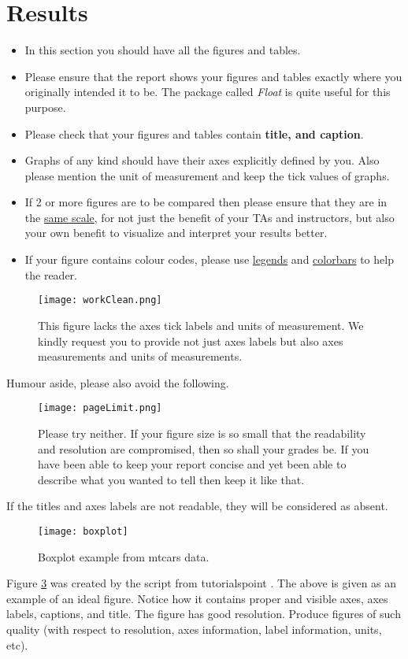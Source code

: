 \section{Results}
\begin{itemize}
 \item In this section you should have all the figures and tables.
 \item Please ensure that the report shows your figures and tables exactly where you originally intended it to be. 
 The package called \textit{Float} is quite useful for this purpose. 
 \item Please check that your figures and tables contain \textbf{title, and caption}.
 \item Graphs of any kind should have their axes explicitly defined by you.  Also please mention the unit of measurement and keep the tick values of graphs.
 \item If 2 or more figures are to be compared then please ensure that they are in the \underline{same scale}, for not just the benefit of your TAs and instructors, but
 also your own benefit to visualize and interpret your results better.
 \item If your figure contains colour codes, please use \underline{legends} and \underline{colorbars} to help the reader.
\end{itemize}
\begin{figure}[H]
\centering
   \texttt{[image: workClean.png]}
   \caption{This figure lacks the axes tick labels and units of measurement. We kindly request you to provide not just axes labels but also axes measurements and units of measurements.}
   \label{fig:noTicks}
\end{figure}
Humour aside, please also avoid the following.
\begin{figure}[H]
\centering
   \texttt{[image: pageLimit.png]}
   \caption{Please try neither. If your figure size is so small that the readability and resolution are compromised, then so shall your grades be. If you have been able to keep your report concise
   and yet been able to describe what you wanted to tell then keep it like that.}
   \label{fig:PageLimit}
\end{figure}
If the titles and axes labels are not readable, they will be considered as absent. 

\begin{figure}[h]
\begin{center}
\texttt{[image: boxplot]}
\caption{Boxplot example from mtcars data.}
\label{fig:rboxplot}
\end{center}
\end{figure}
Figure \ref{fig:rboxplot} was created by the script from tutorialspoint \cite{Rboxplot}. The above is given as an example of an ideal figure. Notice how it contains proper and visible axes, axes labels, 
captions, and title. The figure has good resolution. Produce figures of such quality (with respect to resolution, axes information, label information, units, etc).